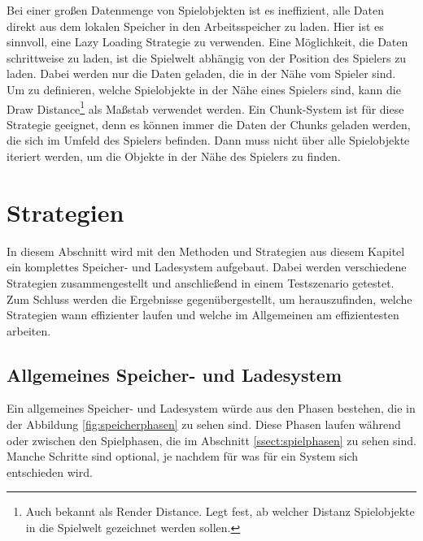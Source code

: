 Bei einer großen Datenmenge von Spielobjekten ist es ineffizient, alle Daten direkt aus dem lokalen Speicher in den Arbeitsspeicher zu laden. Hier ist es sinnvoll, eine Lazy Loading Strategie zu verwenden. Eine Möglichkeit, die Daten schrittweise zu laden, ist die Spielwelt abhängig von der Position des Spielers zu laden. Dabei werden nur die Daten geladen, die in der Nähe vom Spieler sind. Um zu definieren, welche Spielobjekte in der Nähe eines Spielers sind, kann die Draw Distance\footnote{Auch bekannt als Render Distance. Legt fest, ab welcher Distanz Spielobjekte in die Spielwelt gezeichnet werden sollen.\cite{nerdburglarsWhatDraw}} als Maßstab verwendet werden. Ein Chunk-System ist für diese Strategie geeignet, denn es können immer die Daten der Chunks geladen werden, die sich im Umfeld des Spielers befinden. Dann muss nicht über alle Spielobjekte iteriert werden, um die Objekte in der Nähe des Spielers zu finden.




\section{Strategien}
In diesem Abschnitt wird mit den Methoden und Strategien aus diesem Kapitel ein komplettes Speicher- und Ladesystem aufgebaut. Dabei werden verschiedene Strategien zusammengestellt und anschließend in einem Testszenario getestet. Zum Schluss werden die Ergebnisse gegenübergestellt, um herauszufinden, welche Strategien wann effizienter laufen und welche im Allgemeinen am effizientesten arbeiten.

\subsection{Allgemeines Speicher- und Ladesystem}
Ein allgemeines Speicher- und Ladesystem würde aus den Phasen bestehen, die in der Abbildung \ref{fig:speicherphasen} zu sehen sind. Diese Phasen laufen während oder zwischen den Spielphasen, die im Abschnitt \ref{ssect:spielphasen} zu sehen sind. Manche Schritte sind optional, je nachdem für was für ein System sich entschieden wird.

